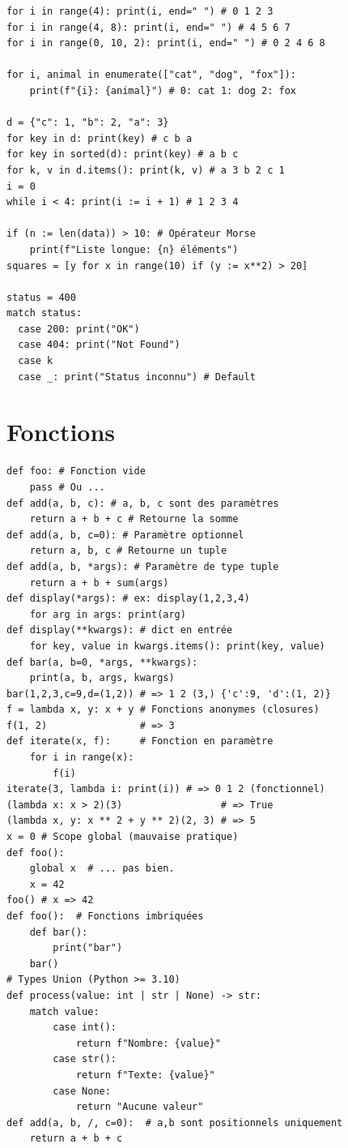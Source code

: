 \documentclass{article}
\begin{document}
\begin{multicols*}{4}
\begin{lstlisting}
for i in range(4): print(i, end=" ") # 0 1 2 3
for i in range(4, 8): print(i, end=" ") # 4 5 6 7
for i in range(0, 10, 2): print(i, end=" ") # 0 2 4 6 8

for i, animal in enumerate(["cat", "dog", "fox"]):
    print(f"{i}: {animal}") # 0: cat 1: dog 2: fox

d = {"c": 1, "b": 2, "a": 3}
for key in d: print(key) # c b a
for key in sorted(d): print(key) # a b c
for k, v in d.items(): print(k, v) # a 3 b 2 c 1
i = 0
while i < 4: print(i := i + 1) # 1 2 3 4

if (n := len(data)) > 10: # Opérateur Morse
    print(f"Liste longue: {n} éléments")
squares = [y for x in range(10) if (y := x**2) > 20]

status = 400
match status:
  case 200: print("OK")
  case 404: print("Not Found")
  case k
  case _: print("Status inconnu") # Default
\end{lstlisting}

\section*{Fonctions}
\begin{lstlisting}
def foo: # Fonction vide
    pass # Ou ...
def add(a, b, c): # a, b, c sont des paramètres
    return a + b + c # Retourne la somme
def add(a, b, c=0): # Paramètre optionnel
    return a, b, c # Retourne un tuple
def add(a, b, *args): # Paramètre de type tuple
    return a + b + sum(args)
def display(*args): # ex: display(1,2,3,4)
    for arg in args: print(arg)
def display(**kwargs): # dict en entrée
    for key, value in kwargs.items(): print(key, value)
def bar(a, b=0, *args, **kwargs):
    print(a, b, args, kwargs)
bar(1,2,3,c=9,d=(1,2)) # => 1 2 (3,) {'c':9, 'd':(1, 2)}
f = lambda x, y: x + y # Fonctions anonymes (closures)
f(1, 2)                # => 3
def iterate(x, f):     # Fonction en paramètre
    for i in range(x):
        f(i)
iterate(3, lambda i: print(i)) # => 0 1 2 (fonctionnel)
(lambda x: x > 2)(3)                 # => True
(lambda x, y: x ** 2 + y ** 2)(2, 3) # => 5
x = 0 # Scope global (mauvaise pratique)
def foo():
    global x  # ... pas bien.
    x = 42
foo() # x => 42
def foo():  # Fonctions imbriquées
    def bar():
        print("bar")
    bar()
# Types Union (Python >= 3.10)
def process(value: int | str | None) -> str:
    match value:
        case int():
            return f"Nombre: {value}"
        case str():
            return f"Texte: {value}"
        case None:
            return "Aucune valeur"
def add(a, b, /, c=0):  # a,b sont positionnels uniquement
    return a + b + c
\end{lstlisting}


\end{multicols*}
\end{document}
